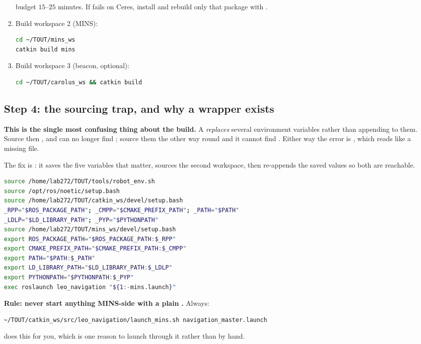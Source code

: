 \begin{enumerate}[leftmargin=1.4em]
  budget $15$--$25$ minutes. If  fails on Ceres, install
   and rebuild only that package with
  .
\item Build workspace 2 (MINS):
\begin{lstlisting}[language=bash]
cd ~/TOUT/mins_ws
catkin build mins
\end{lstlisting}
\item Build workspace 3 (beacon, optional):
\begin{lstlisting}[language=bash]
cd ~/TOUT/carolus_ws && catkin build
\end{lstlisting}
\end{enumerate}

\subsection{Step 4: the sourcing trap, and why a wrapper exists}
\label{ap:repro-sourcetrap}
\textbf{This is the single most confusing thing about the build.} A
 \emph{replaces} several environment variables rather
than appending to them. Source  then , and
 can no longer find ; source them the
other way round and it cannot find . Either way the error is
, which reads like a
missing file.

The fix is : it saves the
five variables that matter, sources the second workspace, then re-appends the
saved values so both are reachable.

\begin{lstlisting}[language=bash]
source /home/lab272/TOUT/tools/robot_env.sh
source /opt/ros/noetic/setup.bash
source /home/lab272/TOUT/catkin_ws/devel/setup.bash
_RPP="$ROS_PACKAGE_PATH"; _CMPP="$CMAKE_PREFIX_PATH"; _PATH="$PATH"
_LDLP="$LD_LIBRARY_PATH"; _PYP="$PYTHONPATH"
source /home/lab272/TOUT/mins_ws/devel/setup.bash
export ROS_PACKAGE_PATH="$ROS_PACKAGE_PATH:$_RPP"
export CMAKE_PREFIX_PATH="$CMAKE_PREFIX_PATH:$_CMPP"
export PATH="$PATH:$_PATH"
export LD_LIBRARY_PATH="$LD_LIBRARY_PATH:$_LDLP"
export PYTHONPATH="$PYTHONPATH:$_PYP"
exec roslaunch leo_navigation "${1:-mins.launch}"
\end{lstlisting}

\noindent \textbf{Rule: never start anything MINS-side with a plain
.} Always:
\begin{lstlisting}[language=bash]
~/TOUT/catkin_ws/src/leo_navigation/launch_mins.sh navigation_master.launch
\end{lstlisting}
 does this for you, which is one reason to
launch through it rather than by hand.

